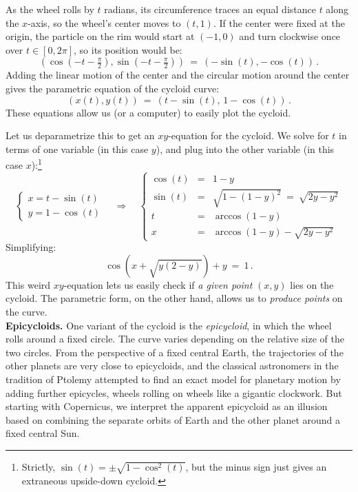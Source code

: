 \documentclass[11pt]{article}
\begin{document}
\noindent
As the wheel rolls by $t$ radians, its circumference traces an 
equal distance $t$ along the $x$-axis, 
so the wheel's center moves to $(t,1)$.
If the center were fixed at the origin, the particle
on the rim would start at $(-1,0)$ and
turn clockwise once over $t\in[0,2\pi]$,
so its position would be:
$$
(\cos(-t{-}\tfrac\pi2), \sin(-t{-}\tfrac\pi2))
\ =\
(-\sin(t), -\cos(t))\,.
$$ 
Adding the linear motion of the center and the circular motion
around the center gives the parametric equation of the cycloid curve:
$$
(x(t), y(t)) \ =\
(t-\sin(t), \, 1-\cos(t))\,.
$$
These equations allow us (or a computer) to easily plot the cycloid.

Let us deparametrize this to get an $xy$-equation for the cycloid.
We solve for $t$ in terms of one variable (in this case $y$), and plug into the other variable (in this case $x$):\footnote{Strictly, $\sin(t)=\pm\sqrt{1-\cos^2(t)}$, but the minus sign just gives an extraneous upside-down cycloid.} 
$$\left\{ \begin{array}{c}
x = t-\sin(t)
\\
y = 1-\cos(t)
\end{array}\right.
\quad\Longrightarrow\quad
\left\{ \begin{array}{rcl}
\cos(t) &=& 1-y
\\[.3em]
\sin(t) &=& \sqrt{1{-}(1{-}y)^2} \ = \ \sqrt{2y{-}y^2}
\\[.3em]
t &=& \arccos(1{-}y)
\\[.3em]
x &=& \arccos(1{-}y)-\sqrt{2y{-}y^2}
\end{array}\right.
$$
Simplifying:
$$
\cos\!\left(x+\sqrt{y(2{-}y)}\right) + y \ =\ 1\,.
$$
This weird $xy$-equation lets us easily check if {\it a given point} $(x,y)$ lies on the cycloid.
The parametric form, on the other hand, allows us to {\it produce points} on the curve.
\\[1em]
{\bf Epicycloids.} 
One variant of the cycloid is the {\it epicycloid}, in which
the wheel rolls around a fixed circle. The curve varies 
depending on the relative size of the two circles. 
From the perspective of a fixed central Earth, the trajectories 
of the other planets are very close to epicycloids,
and the classical astronomers in the tradition of Ptolemy 
attempted to find an exact model for planetary motion by adding 
further epicycles, wheels rolling on wheels like a gigantic clockwork.
But starting with Copernicus, we interpret the apparent
epicycloid as an illusion based on combining
the separate orbits of Earth and the other planet around a 
fixed central Sun.
\end{document}
